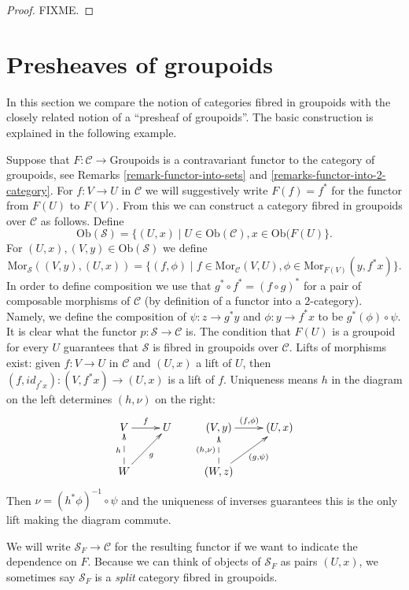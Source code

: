 \begin{proof}
FIXME.
\end{proof}

\section{Presheaves of groupoids}
\label{section-presheaves-groupoids}

\noindent
In this section we compare the notion of categories fibred in groupoids
with the closely related notion of a ``presheaf of groupoids''. The basic
construction is explained in the following example.

\begin{example}
\label{example-functor-groupoids}
Suppose that $F : \mathcal{C} \to \text{Groupoids}$ is a contravariant functor
to the category of groupoids, see Remarks \ref{remark-functor-into-sets} and
\ref{remarks-functor-into-2-category}.
For $f : V \to U$ in $\mathcal{C}$ we will
suggestively write $F(f) = f^\ast$ for the functor from $F(U)$ to $F(V)$. 
From this we can construct a category fibred in groupoids over $\mathcal{C}$ 
as follows. Define 
$$
\text{Ob}(\mathcal{S}) =
\{(U,x) \mid U\in \text{Ob}(\mathcal{C}), x\in \text{Ob}(F(U)\}.
$$ 
For $(U,x), (V,y) \in \text{Ob}(\mathcal{S})$ we define
$$
\text{Mor}_\mathcal{S}((V,y),(U,x)) = 
\{ (f, \phi) \mid f\in \text{Mor}_\mathcal{C}(V,U), 
\phi \in \text{Mor}_{F(V)}(y, f^\ast x)\}.
$$
In order to define composition we use that $g^\ast \circ f^\ast = 
(f \circ g)^\ast$ for a pair of composable morphisms of $\mathcal{C}$
(by definition of a functor into a $2$-category).
Namely, we define the composition of $\psi : z \to g^\ast y$ and 
$ \phi : y \to f^\ast x$ to be $ g^\ast(\phi) \circ \psi$. It is clear
what the functor $p : \mathcal{S} \to \mathcal{C}$ is. The condition
that $F(U)$ is a groupoid for every $U$ guarantees that $\mathcal{S}$ is
fibred in groupoids over $\mathcal{C}$. Lifts of morphisms exist: given 
$f: V \to U$ in $\mathcal{C}$ and $(U,x)$ a lift of $U$, then 
$(f, id_{f^\ast x}): (V, {f^\ast x}) \to (U,x)$ is a lift of $f$. 
Uniqueness means $h$ in the diagram on the left determines $(h,\nu)$ on 
the right:
$$
\xymatrix{
V \ar[r]^f & U & (V,y) \ar[r]^{(f, \phi)} & (U,x) \\
W \ar@{-->}[u]^h \ar[ru]_g & &
(W,z) \ar@{-->}[u]^{(h,\nu)} \ar[ru]_{(g, \psi)} & \\
}
$$
Then $\nu = (h^\ast \phi)^{-1} \circ \psi $ and the uniqueness of inverses
guarantees this is the only lift making the diagram commute.

\noindent
We will write $\mathcal{S}_F \to \mathcal{C}$ for the resulting functor
if we want to indicate the dependence on $F$. Because we can think of 
objects of $\mathcal{S}_F$ as pairs $(U,x)$, we sometimes say $\mathcal{S}_F$ 
is a {\it split} category fibred in groupoids.
\end{example}

